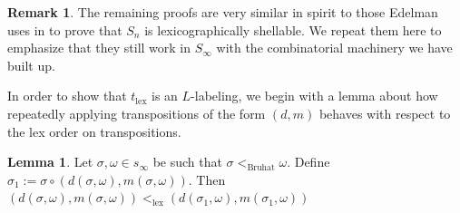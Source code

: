 \documentclass[oneside,11pt,reqno]{amsart}
\theoremstyle{definition}
\newtheorem{remark}{Remark}
\newtheorem{proof techniques}{Proof Techniques}
\newtheorem{lemma}{Lemma}
\begin{document}
\begin{remark}
    The remaining proofs are very similar in spirit to those Edelman uses in \cite{edelman1981bruhat} to prove that $S_n$ is lexicographically shellable. We repeat them here to emphasize that they still work in $S_\infty$ with the combinatorial machinery we have built up. 
\end{remark}

In order to show that $t_\text{lex}$ is an $L$-labeling, we begin with a lemma about how repeatedly applying transpositions of the form $(d , m)$ behaves with respect to the lex order on transpositions.

\begin{lemma}\label{lem: d m increasing in lex ordering}
    Let $\sigma , \omega \in s_\infty$ be such that $\sigma <_\text{Bruhat} \omega$. Define $\sigma_1 := \sigma \circ (d(\sigma , \omega) , m(\sigma , \omega))$. Then $(d(\sigma, \omega), m(\sigma,\omega)) <_\text{lex} (d(\sigma_1, \omega), m(\sigma_1,\omega))$ 
\end{lemma}
\end{document}
